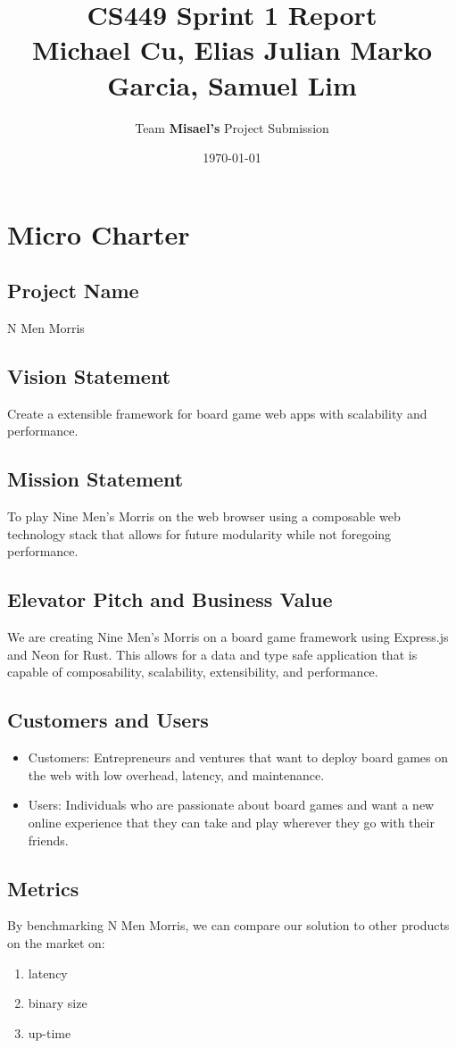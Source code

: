 \documentclass[11pt]{article}
\author{Team \textbf{Misael's} Project Submission}
\date{\today}
\title{CS449 Sprint 1 Report\\\medskip
\large Michael Cu, Elias Julian Marko Garcia, Samuel Lim}
\begin{document}
\maketitle
\tableofcontents


\section{Micro Charter}
\label{sec:org884c74f}
\subsection{Project Name}
\label{sec:org3f47d10}
N Men Morris
\subsection{Vision Statement}
\label{sec:org19b528a}
Create a extensible framework for board game web apps with scalability and performance.
\subsection{Mission Statement}
\label{sec:orgd866ec3}
To play Nine Men's Morris on the web browser using a composable web technology stack that allows
for future modularity while not foregoing performance.
\subsection{Elevator Pitch and Business Value}
\label{sec:org05f6ceb}
We are creating Nine Men's Morris on a board game framework using Express.js and Neon for
Rust. This allows for a data and type safe application that is capable of composability,
scalability, extensibility, and performance.
\subsection{Customers and Users}
\label{sec:org08544e7}
\begin{itemize}
\item Customers: Entrepreneurs and ventures that want to deploy board games on the web with low
overhead, latency, and maintenance.
\item Users: Individuals who are passionate about board games and want a new online experience that
they can take and play wherever they go with their friends.
\end{itemize}
\subsection{Metrics}
\label{sec:org9c941e4}
By benchmarking N Men Morris, we can compare our solution to other products on the market on:
\begin{enumerate}
\item latency
\item binary size
\item up-time
\end{enumerate}
\end{document}
